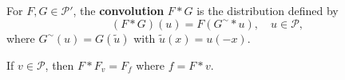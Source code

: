 For $F, G \in \mathcal{P}'$, the \textbf{convolution} $F * G$ is the distribution defined by
$$(F * G)(u) = F(G^\sim * u), \quad u \in \mathcal{P},$$
where $G^\sim(u) = G(\tilde{u})$ with $\tilde{u}(x) = u(-x)$.

If $v \in \mathcal{P}$, then $F * F_v = F_f$ where $f = F * v$.
